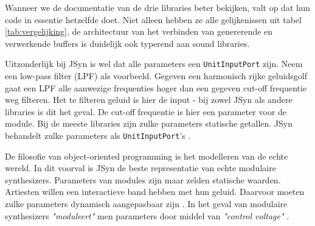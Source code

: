 Wanneer we de documentatie van de drie libraries beter bekijken, valt op dat hun code in essentie hetzelfde doet. Niet alleen hebben ze alle gelijkenissen uit tabel \ref{tab:vergelijking}, de architectuur van het verbinden van genererende en verwerkende buffers is duidelijk ook typerend aan sound libraries.

Uitzonderlijk bij JSyn is wel dat alle parameters een \verb+UnitInputPort+ zijn. Neem een low-pass filter (LPF) als voorbeeld. Gegeven een harmonisch rijke geluidsgolf gaat een LPF alle aanwezige frequenties hoger dan een gegeven cut-off frequentie weg filteren. Het te filteren geluid is hier de input - bij zowel JSyn als andere libraries is dit het geval. De cut-off frequentie is hier een parameter voor de module.\newline
Bij de meeste libraries zijn zulke parameters statische getallen. JSyn behandelt zulke parameters als \verb+UnitInputPort+'s \autocite{jsyndocs}.

De filosofie van object-oriented programming is het modelleren van de echte wereld. In dit voorval is JSyn de beste representatie van echte modulaire synthesizers. Parameters van modules zijn maar zelden statische waarden. Artiesten willen een interactieve band hebben met hun geluid. Daarvoor moeten zulke parameters dynamisch aangepasbaar zijn \autocite{vagabundos}. In het geval van modulaire synthesizers \textit{"moduleert"} men parameters door middel van \textit{"control voltage"} \autocite{modular}.

\iffalse

Dit hoofdstuk bevat je literatuurstudie. De inhoud gaat verder op de inleiding, maar zal het onderwerp van de bachelorproef *diepgaand* uitspitten. De bedoeling is dat de lezer na lezing van dit hoofdstuk helemaal op de hoogte is van de huidige stand van zaken (state-of-the-art) in het onderzoeksdomein. Iemand die niet vertrouwd is met het onderwerp, weet nu voldoende om de rest van het verhaal te kunnen volgen, zonder dat die er nog andere informatie moet over opzoeken \autocite{Pollefliet2011}.

Je verwijst bij elke bewering die je doet, vakterm die je introduceert, enz. naar je bronnen. In \LaTeX{} kan dat met het commando \texttt{$\backslash${textcite\{\}}} of \texttt{$\backslash${autocite\{\}}}. Als argument van het commando geef je de ``sleutel'' van een ``record'' in een bibliografische databank in het Bib\LaTeX{}-formaat (een tekstbestand). Als je expliciet naar de auteur verwijst in de zin, gebruik je \texttt{$\backslash${}textcite\{\}}.
Soms wil je de auteur niet expliciet vernoemen, dan gebruik je \texttt{$\backslash${}autocite\{\}}. In de volgende paragraaf een voorbeeld van elk.

\textcite{Knuth1998} schreef een van de standaardwerken over sorteer- en zoekalgoritmen. Experten zijn het erover eens dat cloud computing een interessante opportuniteit vormen, zowel voor gebruikers als voor dienstverleners op vlak van informatietechnologie~\autocite{Creeger2009}.

\lipsum[7-20]

\fi
